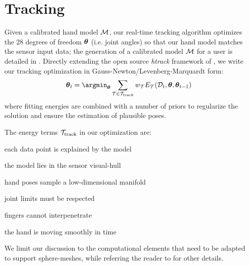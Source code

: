 

\section{Tracking}
\label{sec:tracking}
Given a calibrated hand model $\mathcal{M}$, our real-time tracking algorithm optimizes the 28 degrees of freedom $\boldsymbol{\theta}$ (i.e. joint angles) so that our hand model matches the sensor input data; the generation of a calibrated model $\mathcal{M}$ for a user is detailed in . Directly extending the open source \emph{htrack} framework of \cite{tagliasacchi2015robust}, we write our tracking optimization in Gauss-Newton/Levenberg-Marquardt form:
% 
\begin{eqnarray}
\parpose_t = \argmin_{\parpose}
\sum_{\mathcal{T} \in \termstrack} 
w_\mathcal{T} E_\mathcal{T}(\depth_t,\parpose,\parpose_{t-1})
\label{eq:htrack}
\end{eqnarray}
% 
where fitting energies are combined with a number of priors to regularize the solution and ensure the estimation of plausible poses. 

The energy terms ${\mathcal{T}_\text{track}}$ in our optimization are:
% 
\begin{description}[labelsep=0em,labelwidth=.6in,labelindent=.25cm,itemsep=-.6em]
    \item[d2m]          each data point is explained by the model
    \item[m2d]          the model lies in the sensor visual-hull
    \item[pose]         hand poses sample a low-dimensional manifold
    \item[limits]       joint limits must be respected
    \item[collision]    fingers cannot interpenetrate
    \item[temporal]     the hand is moving smoothly in time
\end{description}
% 
We limit our discussion to the computational elements that need to be adapted to support sphere-meshes, while referring the reader to \cite{tagliasacchi2015robust} for other details.

